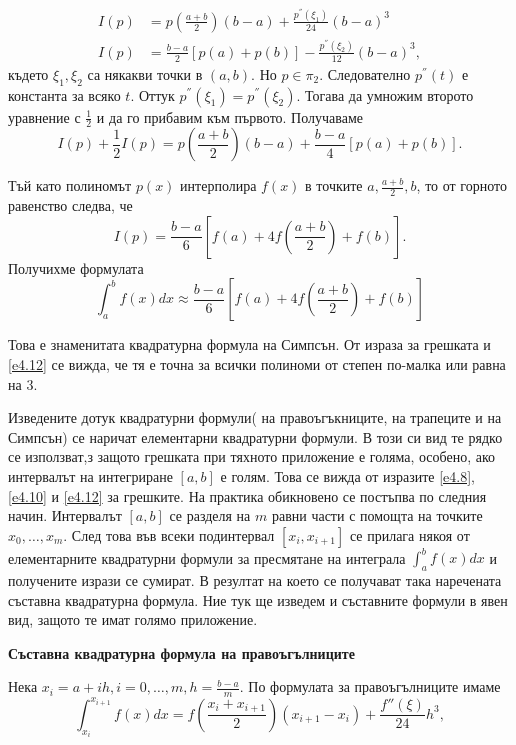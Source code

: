 \documentclass[12pt]{article}
\numberwithin{equation}{section}
\numberwithin{theorem}{section}
\numberwithin{definition}{section}
\numberwithin{corollary}{section}
\begin{document}
\begin{align*}
I(p)&=p\left(\frac{a+b}{2}\right)(b-a)+\frac{p^{''}(\xi_1)}{24}(b-a)^3\\
I(p)&=\frac{b-a}{2}[p(a)+p(b)]-\frac{p^{''}(\xi_2)}{12}(b-a)^3,
\end{align*}
където $\xi_1,\xi_2$ са някакви точки в $(a,b)$. Но $p\in\pi_2$. Следователно $p^{''}(t)$ е константа за всяко $t$. Оттук $p^{''}(\xi_1) = p^{''}(\xi_2)$. Тогава да умножим второто уравнение с $\frac{1}{2}$ и да го прибавим към първото.
Получаваме
\[
I(p)+\frac{1}{2}I(p) = p\left(\frac{a+b}{2}\right)(b-a) + \frac{b-a}{4}[p(a)+p(b)].
\]
\par
Тъй като полиномът $p(x)$ интерполира $f(x)$ в точките $a,\frac{a+b}{2},b$, то от горното равенство следва, че
\begin{equation}\label{e4.13}
I(p) = \frac{b-a}{6}\left[f(a)+4f\left(\frac{a+b}{2}\right)+f(b)\right].
\end{equation}
Получихме формулата
\begin{equation}\label{e4.14}
\int_a^bf(x)dx \approx \frac{b-a}{6}\left[f(a)+4f\left(\frac{a+b}{2}\right)+f(b)\right]
\end{equation}
\par
Това е знаменитата квадратурна формула на Симпсън. От израза за грешката и \ref{e4.12} се вижда, че тя е точна за всички полиноми от степен по-малка или равна на $3$.
\par
Изведените дотук квадратурни формули( на правоъгъкниците, на трапеците и на Симпсън) се наричат елементарни квадратурни формули. В този си вид те рядко се използват,з защото грешката при тяхното приложение е голяма, особено, ако интервалът на интегриране $[a,b]$ е голям. Това се вижда от изразите \ref{e4.8},\ref{e4.10} и \ref{e4.12} за грешките. На практика обикновено се постъпва по следния начин. Интервалът $[a,b]$ се разделя на $m$ равни части с помощта на точките $x_0,\dotso, x_m$. След това във всеки подинтервал $[x_i,x_{i+1}]$ се прилага някоя от елементарните квадратурни формули за пресмятане на интеграла $\int_a^bf(x)dx$ и получените изрази се сумират. В резултат на което се получават така наречената съставна квадратурна формула. Ние тук ще изведем и съставните формули в явен вид, защото те имат голямо приложение.
\begin{center}
\textbf{Съставна квадратурна формула на правоъгълниците}
\end{center}
\par
Нека $x_i = a+ih, i=0,\dotso,m, h=\frac{b-a}{m}$. По формулата за правоъгълниците имаме
\[
\int_{x_i}^{x_{i+1}}f(x)dx = f\left(\frac{x_i+x_{i+1}}{2}\right)(x_{i+1} - x_i) + \frac{f''(\xi)}{24}h^3,
\]
\end{document}
